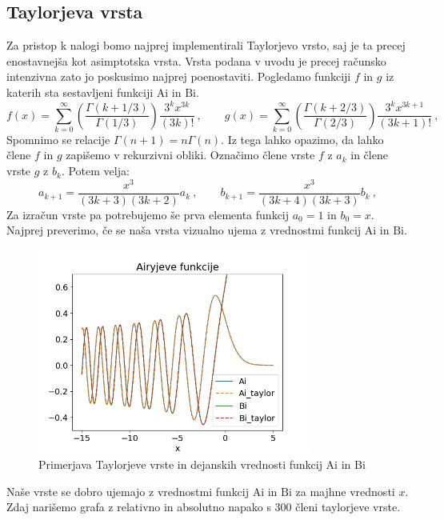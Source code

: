\documentclass{article}
\newcommand{\Ai}{\mathrm{Ai}}
\newcommand{\Bi}{\mathrm{Bi}}
\begin{document}
\subsection{Taylorjeva vrsta}
Za pristop k nalogi bomo najprej implementirali Taylorjevo vrsto, saj je ta precej enostavnejša kot asimptotska vrsta. Vrsta podana v uvodu je precej računsko intenzivna zato jo poskusimo najprej poenostaviti. Pogledamo funkciji $f$ in $g$ iz katerih sta sestavljeni funkciji $\Ai$ in $\Bi$.
\begin{equation*}
  f(x) = \sum_{k=0}^\infty
  \left(\frac{\Gamma(k + 1/3)}{\Gamma(1/3)}\right) \frac{3^k x^{3k}}{(3k)!} \>, \qquad
  g(x) = \sum_{k=0}^\infty
  \left(\frac{\Gamma(k + 2/3)}{\Gamma(2/3)}\right) \frac{3^k x^{3k+1}}{(3k+1)!} \>,
\end{equation*}
Spomnimo se relacije $\Gamma(n+1)=n\Gamma(n)$. Iz tega lahko opazimo, da lahko člene $f$ in $g$ zapišemo v rekurzivni obliki. Označimo člene vrste $f$ z $a_k$ in člene vrste $g$ z $b_k$. Potem velja:
\begin{equation*}
    a_{k+1} = \frac{x^3}{(3k + 3)(3k + 2)} a_k \>, \qquad
    b_{k+1} = \frac{x^3}{(3k + 4)(3k + 3)} b_k \>,
\end{equation*}
Za izračun vrste pa potrebujemo še prva elementa funkcij $a_0=1$ in $b_0=x$. \\
Najprej preverimo, če se naša vrsta vizualno ujema z vrednostmi funkcij $\Ai$ in $\Bi$.
\begin{figure}[H]
    \centering
    \includegraphics[width=0.8\textwidth]{taylor_comparison.png}
    \caption{Primerjava Taylorjeve vrste in dejanskih vrednosti funkcij $\Ai$ in $\Bi$}
\end{figure}
Naše vrste se dobro ujemajo z vrednostmi funkcij $\Ai$ in $\Bi$ za majhne vrednosti $x$. Zdaj narišemo grafa z relativno in absolutno napako s 300 členi taylorjeve vrste.
\end{document}
